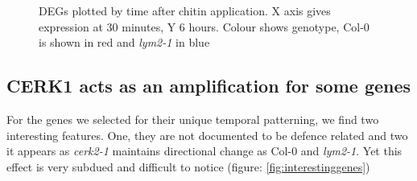 \documentclass[../main.tex]{subfiles}
\begin{document}
\begin{figure}[!ht]
  \centering
  \caption[Differential genes plotted by expression at two time points]{DEGs plotted by time after chitin application. X axis gives
    expression at 30 minutes, Y 6 hours. Colour shows genotype, Col-0 is shown
    in red and \textit{lym2-1} in blue}
  \label{fig:diverg}
\end{figure}


\subsection{CERK1 acts as an amplification for some genes}
\label{sec:cerk1-acts-as}

For the genes we selected for their unique temporal patterning, we find two
interesting features. One, they are not documented to be defence related and two
it appears as \textit{cerk2-1} maintains directional change as Col-0 and
\textit{lym2-1}. Yet this effect is very subdued and difficult to notice
(figure: \ref{fig:interestinggenes})
\end{document}
